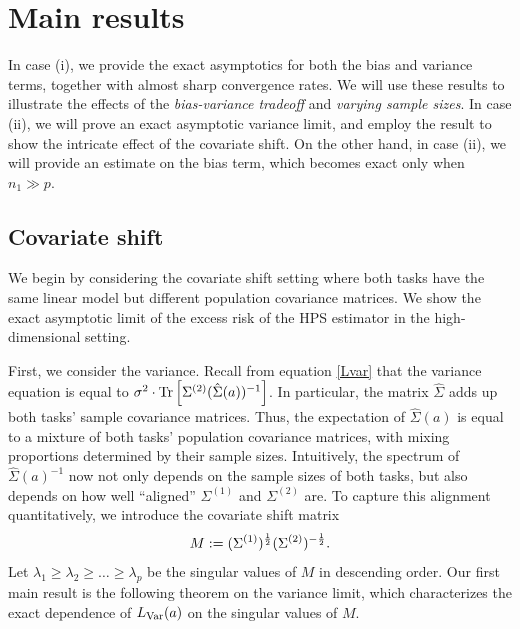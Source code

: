 \section{Main results}\label{sec_main}

In case (i), we provide the exact asymptotics for both the bias and variance terms, together with almost sharp convergence rates. We will use these results to illustrate the effects of the \emph{bias-variance tradeoff} and \emph{varying sample sizes}. In case (ii), we will prove an exact asymptotic variance limit, and employ the result to show the intricate effect of the covariate shift. On the other hand, in case (ii), we will provide an estimate on the bias term, which becomes exact only when $n_1\gg p$. 


\subsection{Covariate shift}\label{sec_diff}

We begin by considering the covariate shift setting where both tasks have the same linear model but different population covariance matrices.
We show the exact asymptotic limit of the excess risk of the HPS estimator in the high-dimensional setting.

First, we consider the variance. Recall from equation \eqref{Lvar} that the variance equation is equal to $\sigma^2 \cdot \operatorname{Tr}\left[\Sigma^{(2)} (\hat\Sigma(a))^{-1}\right]$.
In particular, the matrix $\hat{\Sigma}$ adds up both tasks' sample covariance matrices.
Thus, the expectation of $\hat{\Sigma}(a)$ is equal to a mixture of both tasks' population covariance matrices, with mixing proportions determined by their sample sizes.
Intuitively, the spectrum of $\hat{\Sigma}(a)^{-1}$ now not only depends on the sample sizes of both tasks, but also depends on how well ``aligned'' $\Sigma^{(1)}$ and $\Sigma^{(2)}$ are.
To capture this alignment quantitatively, we introduce the covariate shift matrix %
$$ M := (\Sigma^{(1)})^{\frac 1 2}(\Sigma^{(2)})^{-\frac 1 2}.$$
Let $\lambda_1 \ge \lambda_2 \ge \dots\ge \lambda_p $ be the singular values of $M$ in descending order.
Our first main result is the following theorem on the variance limit, which characterizes the exact dependence of $L_{\operatorname{Var}}(a)$ on the singular values of $M$.


